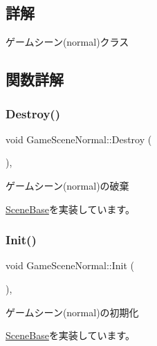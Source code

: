 \subsection{詳解}
ゲームシーン(normal)クラス 

\subsection{関数詳解}
\mbox{\label{class_game_scene_normal_a1c06daa1715624eabd199472a37d97cd}} 
\subsubsection{\texorpdfstring{Destroy()}{Destroy()}}
{\footnotesize\ttfamily void Game\+Scene\+Normal\+::\+Destroy (\begin{DoxyParamCaption}{ }\end{DoxyParamCaption})\hspace{0.3cm}{\ttfamily [final]}, {\ttfamily [virtual]}}



ゲームシーン(normal)の破棄 



\mbox{\hyperlink{class_scene_base_a7c5b54020bc519b4dadfe9770d6b27f7}{Scene\+Base}}を実装しています。

\mbox{\label{class_game_scene_normal_ac3f3e52cf1c24802035f38fccb221fd3}} 
\subsubsection{\texorpdfstring{Init()}{Init()}}
{\footnotesize\ttfamily void Game\+Scene\+Normal\+::\+Init (\begin{DoxyParamCaption}{ }\end{DoxyParamCaption})\hspace{0.3cm}{\ttfamily [final]}, {\ttfamily [virtual]}}



ゲームシーン(normal)の初期化 



\mbox{\hyperlink{class_scene_base_a24d7db43c819924dc8b07b436f6d3148}{Scene\+Base}}を実装しています。

